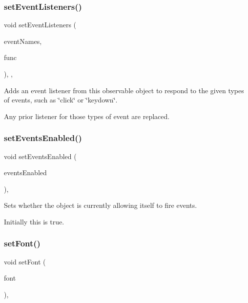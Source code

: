 \subsubsection{\texorpdfstring{set\+Event\+Listeners()}{setEventListeners()}\hspace{0.1cm}{\footnotesize\ttfamily [2/2]}}
{\footnotesize\ttfamily void set\+Event\+Listeners (\begin{DoxyParamCaption}\item[{std\+::initializer\+\_\+list$<$ std\+::string $>$}]{event\+Names,  }\item[{G\+Event\+Listener\+Void}]{func }\end{DoxyParamCaption})\hspace{0.3cm}{\ttfamily [protected]}, {\ttfamily [virtual]}, {\ttfamily [inherited]}}



Adds an event listener from this observable object to respond to the given types of events, such as \char`\"{}click\char`\"{} or \char`\"{}keydown\char`\"{}. 

Any prior listener for those types of event are replaced. \mbox{\label{classGObservable_afaa30b2a9e0f378fd1c70d2f1d0b8216}} 
\subsubsection{\texorpdfstring{set\+Events\+Enabled()}{setEventsEnabled()}}
{\footnotesize\ttfamily void set\+Events\+Enabled (\begin{DoxyParamCaption}\item[{bool}]{events\+Enabled }\end{DoxyParamCaption})\hspace{0.3cm}{\ttfamily [virtual]}, {\ttfamily [inherited]}}



Sets whether the object is currently allowing itself to fire events. 

Initially this is true. \mbox{\label{classGTable_ad1d75b3840a41ba7d1e8a921696dc684}} 
\subsubsection{\texorpdfstring{set\+Font()}{setFont()}\hspace{0.1cm}{\footnotesize\ttfamily [1/2]}}
{\footnotesize\ttfamily void set\+Font (\begin{DoxyParamCaption}\item[{const Q\+Font \&}]{font }\end{DoxyParamCaption})\hspace{0.3cm}{\ttfamily [override]}, {\ttfamily [virtual]}}



